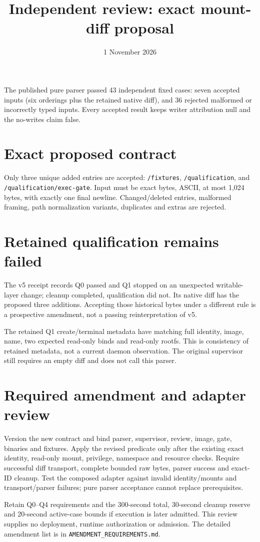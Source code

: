\documentclass[10pt]{article}\usepackage[margin=0.8in]{geometry}\usepackage[T1]{fontenc}\usepackage{lmodern,hyperref}
\title{Independent review: exact mount-diff proposal}\date{1 November 2026}
\begin{document}
\maketitle
The published pure parser passed 43 independent fixed cases: seven accepted inputs (six orderings plus the retained native diff), and 36 rejected malformed or incorrectly typed inputs. Every accepted result keeps writer attribution null and the no-writes claim false.
\section*{Exact proposed contract}
Only three unique added entries are accepted: \texttt{/fixtures}, \texttt{/qualification}, and \texttt{/qualification/exec-gate}. Input must be exact bytes, ASCII, at most 1,024 bytes, with exactly one final newline. Changed/deleted entries, malformed framing, path normalization variants, duplicates and extras are rejected.
\section*{Retained qualification remains failed}
The v5 receipt records Q0 passed and Q1 stopped on an unexpected writable-layer change; cleanup completed, qualification did not. Its native diff has the proposed three additions. Accepting those historical bytes under a different rule is a prospective amendment, not a passing reinterpretation of v5.

The retained Q1 create/terminal metadata have matching full identity, image, name, two expected read-only binds and read-only rootfs. This is consistency of retained metadata, not a current daemon observation. The original supervisor still requires an empty diff and does not call this parser.
\section*{Required amendment and adapter review}
Version the new contract and bind parser, supervisor, review, image, gate, binaries and fixtures. Apply the revised predicate only after the existing exact identity, read-only mount, privilege, namespace and resource checks. Require successful diff transport, complete bounded raw bytes, parser success and exact-ID cleanup. Test the composed adapter against invalid identity/mounts and transport/parser failures; pure parser acceptance cannot replace prerequisites.

Retain Q0--Q4 requirements and the 300-second total, 30-second cleanup reserve and 20-second active-case bounds if execution is later admitted. This review supplies no deployment, runtime authorization or admission. The detailed amendment list is in \texttt{AMENDMENT\_REQUIREMENTS.md}.
\end{document}
